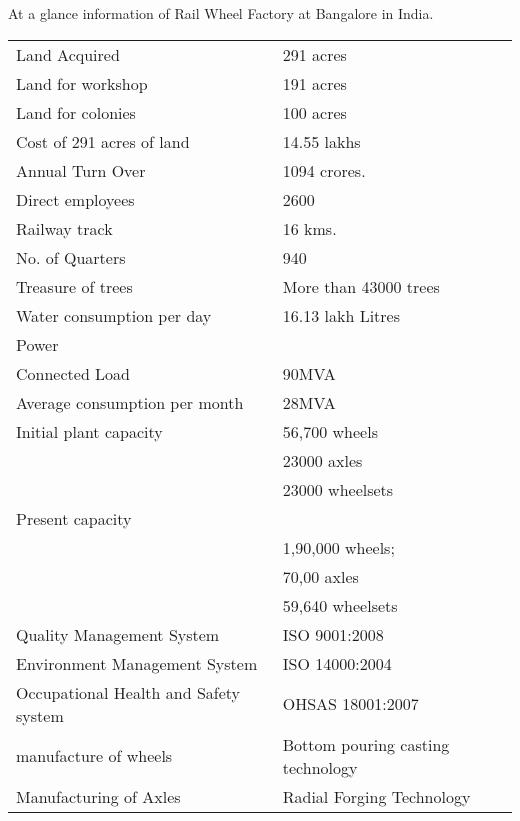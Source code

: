 At a glance information of Rail Wheel Factory at Bangalore in India.


\begin{tabular}[h]{|l|p{3cm}|}
Land   Acquired  &  291 acres \\
Land for workshop & 191 acres \\
Land for colonies & 100 acres \\
Cost of 291 acres of land & 14.55 lakhs \\
Annual Turn Over & 1094 crores.\\
Direct employees & 2600 \\
Railway track &  16 kms. \\
No. of Quarters &  940 \\
Treasure of trees & More than 43000 trees\\
Water consumption per day & 16.13 lakh Litres \\
Power  & \\
Connected Load & 90MVA \\
Average consumption per month & 28MVA \\

Initial plant  capacity  &  56,700 wheels\\
                        & 23000 axles \\
                        & 23000 wheelsets \\
Present capacity & \\ 
					& 1,90,000 wheels;\\
					& 70,00 axles \\
					& 59,640 wheelsets \\
Quality Management System & ISO 9001:2008 \\
Environment Management System & ISO 14000:2004 \\
Occupational Health and Safety system & OHSAS 18001:2007 \\
manufacture of wheels &
Bottom pouring casting technology \\
Manufacturing of Axles & Radial Forging Technology \\
\end{tabular}


